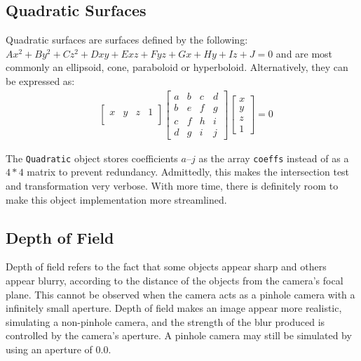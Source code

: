 \documentclass[a4paper]{article}
\begin{document}
\subsection{Quadratic Surfaces}
Quadratic surfaces are surfaces defined by the following: $ Ax^{2}+By^{2}+Cz^{2}+Dxy+Exz+Fyz+Gx+Hy+Iz+J=0 $ and are most commonly an ellipsoid, cone, paraboloid or hyperboloid. Alternatively, they can be expressed as:
\begin{align*}
    &
    \begin{bmatrix}
        x & y & z & 1 \\
    \end{bmatrix}
    \begin{bmatrix}
        a & b & c & d \\
        b & e & f & g \\
        c & f & h & i \\
        d & g & i & j 
    \end{bmatrix}
    \begin{bmatrix}
        x \\
        y \\
        z \\
        1
    \end{bmatrix} = 0
\end{align*}

The \texttt{Quadratic} object stores coefficients $a$--$j$ as the array \texttt{coeffs} instead of as a $4*4$ matrix to prevent redundancy. Admittedly, this makes the intersection test and transformation very verbose. With more time, there is definitely room to make this object implementation more streamlined.

\subsection{Depth of Field}\label{ss:depthoffield}
Depth of field refers to the fact that some objects appear sharp and others appear blurry, according to the distance of the objects from the camera's focal plane. This cannot be observed when the camera acts as a pinhole camera with a infinitely small aperture. Depth of field makes an image appear more realistic, simulating a non-pinhole camera, and the strength of the blur produced is controlled by the camera's aperture. A pinhole camera may still be simulated by using an aperture of $0.0$.
\end{document}
